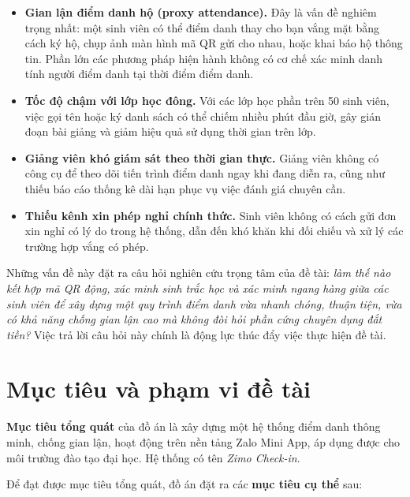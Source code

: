 \documentclass[../main.tex]{subfiles}
\begin{document}
\begin{itemize}[leftmargin=1.5em]
  \item \textbf{Gian lận điểm danh hộ (proxy attendance).} Đây là vấn đề nghiêm trọng
  nhất: một sinh viên có thể điểm danh thay cho bạn vắng mặt bằng cách ký hộ, chụp ảnh
  màn hình mã QR gửi cho nhau, hoặc khai báo hộ thông tin. Phần lớn các phương pháp hiện
  hành không có cơ chế xác minh danh tính người điểm danh tại thời điểm điểm danh.

  \item \textbf{Tốc độ chậm với lớp học đông.} Với các lớp học phần trên 50 sinh viên,
  việc gọi tên hoặc ký danh sách có thể chiếm nhiều phút đầu giờ, gây gián đoạn bài
  giảng và giảm hiệu quả sử dụng thời gian trên lớp.

  \item \textbf{Giảng viên khó giám sát theo thời gian thực.} Giảng viên không có công
  cụ để theo dõi tiến trình điểm danh ngay khi đang diễn ra, cũng như thiếu báo cáo
  thống kê dài hạn phục vụ việc đánh giá chuyên cần.

  \item \textbf{Thiếu kênh xin phép nghỉ chính thức.} Sinh viên không có cách gửi đơn
  xin nghỉ có lý do trong hệ thống, dẫn đến khó khăn khi đối chiếu và xử lý các trường
  hợp vắng có phép.
\end{itemize}

Những vấn đề này đặt ra câu hỏi nghiên cứu trọng tâm của đề tài: \textit{làm thế nào
kết hợp mã QR động, xác minh sinh trắc học và xác minh ngang hàng giữa các sinh viên để
xây dựng một quy trình điểm danh vừa nhanh chóng, thuận tiện, vừa có khả năng chống gian
lận cao mà không đòi hỏi phần cứng chuyên dụng đắt tiền?} Việc trả lời câu hỏi này chính
là động lực thúc đẩy việc thực hiện đề tài.

\section{Mục tiêu và phạm vi đề tài}
\label{sec:muc-tieu}

\textbf{Mục tiêu tổng quát} của đồ án là xây dựng một hệ thống điểm danh thông minh,
chống gian lận, hoạt động trên nền tảng Zalo Mini App, áp dụng được cho môi trường đào
tạo đại học. Hệ thống có tên \textit{Zimo Check-in}.

Để đạt được mục tiêu tổng quát, đồ án đặt ra các \textbf{mục tiêu cụ thể} sau:
\end{document}
